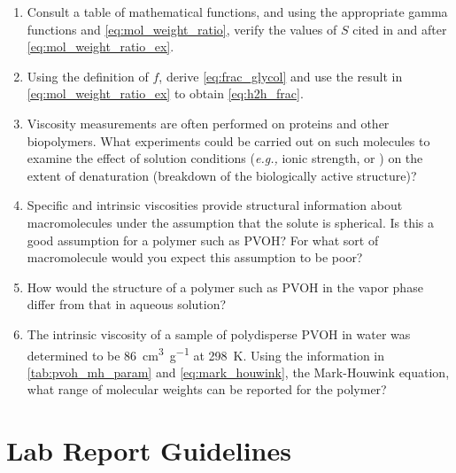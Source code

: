 \documentclass[nobib,nofonts,nols,nohyper]{tufte-handout}
\begin{document}
\begin{enumerate}
	\item Consult a table of mathematical functions, and using the appropriate gamma functions and \cref{eq:mol_weight_ratio}, verify the values of \( S \) cited in and after \cref{eq:mol_weight_ratio_ex}.
	\item Using the definition of \( f \), derive \cref{eq:frac_glycol} and use the result in \cref{eq:mol_weight_ratio_ex} to obtain \cref{eq:h2h_frac}.
	\item Viscosity measurements are often performed on proteins and other biopolymers. 
	What experiments could be carried out on such molecules to examine the effect of solution conditions (\emph{e.g.,} ionic strength, or \ch{\pH}) on the extent of denaturation (breakdown of the biologically active structure)?
	\item Specific and intrinsic viscosities provide structural information about macromolecules under the assumption that the solute is spherical. 
	Is this a good assumption for a polymer such as PVOH? 
	For what sort of macromolecule would you expect this assumption to be poor?
	\item How would the structure of a polymer such as PVOH in the vapor phase differ from that in aqueous solution?
	\item The intrinsic viscosity of a sample of polydisperse PVOH in water was determined to be \SI{86}{\cm\cubed \per \g} at \SI{298}{\K}. 
	Using the information in \cref{tab:pvoh_mh_param} and \cref{eq:mark_houwink}, the Mark-Houwink equation, what range of molecular weights can be reported for the polymer?
\end{enumerate}

\section{Lab Report Guidelines} %
\label{sec:lab_report_guidelines}
\end{document}
